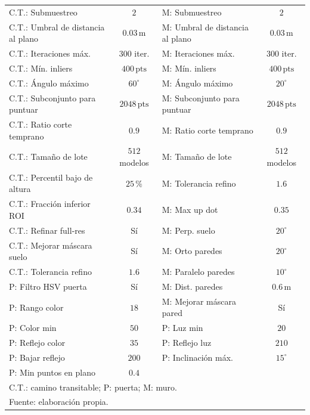 {\begin{longtable}{p{} c p{} c}
C.T.: Submuestreo                          & $2$    & M: Submuestreo                         & $2$ \\
C.T.: Umbral de distancia al plano         & $0.03\,\mathrm{m}$  & M: Umbral de distancia al plano        & $0.03\,\mathrm{m}$ \\
C.T.: Iteraciones máx.                     & $300$ iter.           & M: Iteraciones máx.                    & $300$ iter. \\
C.T.: Mín. inliers                         & $400\,\mathrm{pts}$  & M: Mín. inliers                        & $400\,\mathrm{pts}$ \\
C.T.: Ángulo máximo                        & $60^{\circ}$         & M: Ángulo máximo                       & $20^{\circ}$ \\
C.T.: Subconjunto para puntuar             & $2048\,\mathrm{pts}$ & M: Subconjunto para puntuar            & $2048\,\mathrm{pts}$ \\
C.T.: Ratio corte temprano                 & $0.9$  & M: Ratio corte temprano                & $0.9$ \\
C.T.: Tamaño de lote                       & $512$ modelos & M: Tamaño de lote                      & $512$ modelos \\
C.T.: Percentil bajo de altura             & $25\,\%$     & M: Tolerancia refino                   & $1.6$ \\
C.T.: Fracción inferior ROI                & $0.34$ & M: Max up dot                          & $0.35$ \\
C.T.: Refinar full-res                     & Sí     & M: Perp. suelo                         & $20^{\circ}$ \\
C.T.: Mejorar máscara suelo                & Sí     & M: Orto paredes                        & $20^{\circ}$ \\
C.T.: Tolerancia refino                    & $1.6$  & M: Paralelo paredes                    & $10^{\circ}$ \\
P: Filtro HSV puerta                       & Sí     & M: Dist. paredes                       & $0.6\,\mathrm{m}$ \\
P: Rango color                             & $18$   & M: Mejorar máscara pared               & Sí \\
P: Color min                               & $50$   & P: Luz min                             & $20$ \\
P: Reflejo color                           & $35$   & P: Reflejo luz                         & $210$ \\
P: Bajar reflejo                           & $200$  & P: Inclinación máx.                    & $15^{\circ}$ \\
P: Min puntos en plano                     & $0.4$  &                                        &       \\

\hline
\multicolumn{4}{l}{\footnotesize C.T.: camino transitable; P: puerta; M: muro.} \\
\multicolumn{4}{l}{\footnotesize Fuente: elaboración propia.} \\

\end{longtable}
}
